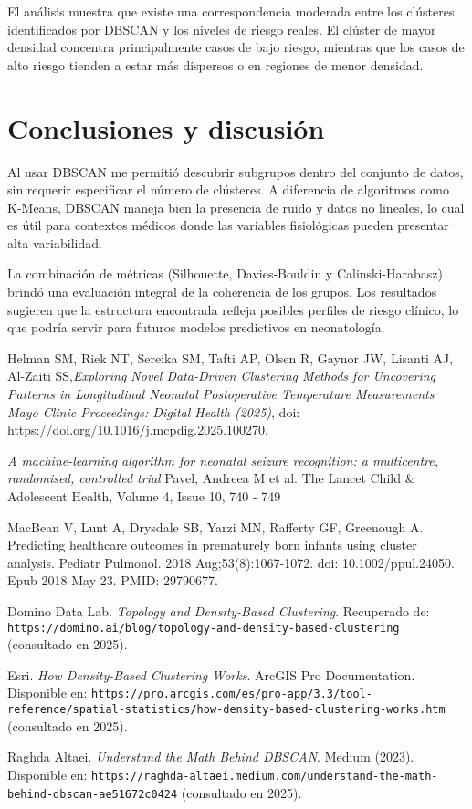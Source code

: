 \documentclass[12pt]{article}
\begin{document}
El análisis muestra que existe una correspondencia moderada entre los clústeres identificados por DBSCAN y los niveles de riesgo reales. El clúster de mayor densidad concentra principalmente casos de bajo riesgo, mientras que los casos de alto riesgo tienden a estar más dispersos o en regiones de menor densidad.


\section{Conclusiones y discusión}

Al usar DBSCAN me permitió descubrir subgrupos dentro del conjunto de datos, sin requerir especificar el número de clústeres. A diferencia de algoritmos como K-Means, DBSCAN maneja bien la presencia de ruido y datos no lineales, lo cual es útil para contextos médicos donde las variables fisiológicas pueden presentar alta variabilidad.

La combinación de métricas (Silhouette, Davies-Bouldin y Calinski-Harabasz) brindó una evaluación integral de la coherencia de los grupos. Los resultados sugieren que la estructura encontrada refleja posibles perfiles de riesgo clínico, lo que podría servir para futuros modelos predictivos en neonatología.



\begin{thebibliography}{99}

Helman SM, Riek NT, Sereika SM, Tafti AP, Olsen R, Gaynor JW, Lisanti AJ,
Al-Zaiti SS,\emph {Exploring Novel Data-Driven Clustering Methods for Uncovering Patterns in Longitudinal
Neonatal Postoperative Temperature Measurements Mayo Clinic Proceedings: Digital Health (2025)},
doi: https://doi.org/10.1016/j.mcpdig.2025.100270.


\emph{A machine-learning algorithm for neonatal seizure recognition: a multicentre, randomised, controlled trial}
Pavel, Andreea M et al.
The Lancet Child & Adolescent Health, Volume 4, Issue 10, 740 - 749

MacBean V, Lunt A, Drysdale SB, Yarzi MN, Rafferty GF, Greenough A. Predicting healthcare outcomes in prematurely born infants using cluster analysis. Pediatr Pulmonol. 2018 Aug;53(8):1067-1072. doi: 10.1002/ppul.24050. Epub 2018 May 23. PMID: 29790677.

Domino Data Lab. \emph{Topology and Density-Based Clustering}. Recuperado de:
\texttt{https://domino.ai/blog/topology-and-density-based-clustering} (consultado en 2025).

Esri. \emph{How Density-Based Clustering Works}. ArcGIS Pro Documentation.
Disponible en: \texttt{https://pro.arcgis.com/es/pro-app/3.3/tool-reference/spatial-statistics/how-density-based-clustering-works.htm} (consultado en 2025).

Raghda Altaei. \emph{Understand the Math Behind DBSCAN}.
Medium (2023). Disponible en: \texttt{https://raghda-altaei.medium.com/understand-the-math-behind-dbscan-ae51672c0424} (consultado en 2025).


\end{thebibliography}
\end{document}
